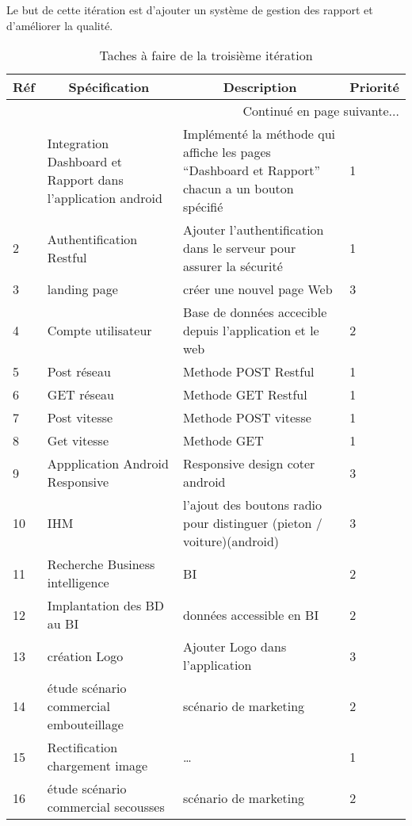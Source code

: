 Le but de cette itération est d'ajouter un système de gestion des rapport et d'améliorer
la qualité.

\begin{center}
    \footnotesize
    \begin{longtable}{| p{1cm} | p{5cm} | p{7cm} | p{1cm} |}
        \caption{Taches à faire de la troisième itération}
        \label{tab:sprint3-backlog} \\

 \hline
 \multicolumn{1}{|c}{\textbf{Réf}} &
 \multicolumn{1}{|c}{\textbf{Spécification}} &
 \multicolumn{1}{|c}{\textbf{Description}} &
 \multicolumn{1}{|c|}{\textbf{Priorité}} \\ \hline
 \endhead

 \hline \multicolumn{4}{|r|}{{Continué en page suivante$\dotsc$}} \\ \hline
 \endfoot

 \hline \hline
 \endlastfoot

\hline
1 & Integration Dashboard et Rapport dans l'application android & Implémenté la méthode qui affiche les pages ``Dashboard et Rapport'' chacun a un bouton spécifié   & 1 \\ \hline
2 & Authentification Restful  & Ajouter l'authentification dans le serveur pour assurer la sécurité   & 1 \\ \hline
3 & landing page & créer une nouvel page Web  & 3\\ \hline
4 & Compte utilisateur & Base de données accecible depuis l'application et le web& 2 \\ \hline
5 & Post réseau & Methode POST Restful & 1 \\ \hline
6 & GET réseau & Methode GET Restful & 1 \\ \hline
7 & Post vitesse & Methode POST vitesse & 1 \\ \hline
8 & Get vitesse & Methode GET & 1 \\ \hline
9 & Appplication Android Responsive & Responsive design coter android & 3 \\ \hline
10 & IHM & l'ajout des boutons radio pour distinguer (pieton / voiture)(android) & 3 \\ \hline
11 & Recherche Business intelligence & BI & 2 \\ \hline
12 & Implantation des BD au BI & données accessible en BI & 2\\ \hline
13 & création Logo &Ajouter Logo dans l'application & 3 \\ \hline
14 & étude scénario commercial embouteillage & scénario de marketing& 2\\ \hline
15 & Rectification chargement image & \ldots & 1 \\ \hline
16 & étude scénario commercial secousses & scénario de marketing& 2\\ \hline
\end{longtable}
\end{center}

